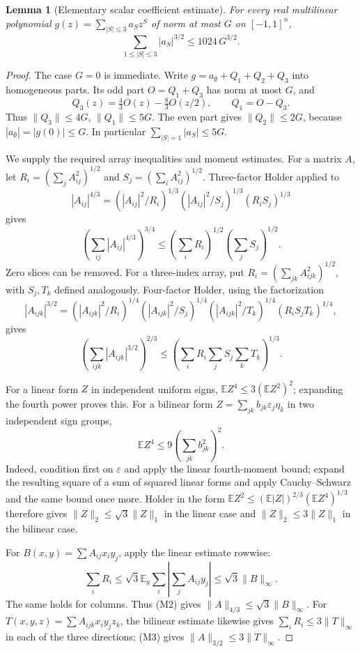 \documentclass[11pt]{article}
\newtheorem{lemma}[theorem]{Lemma}
\newcommand{\E}{\mathbb E}
\begin{document}
\begin{lemma}[Elementary scalar coefficient estimate]\label{lem:bh}
For every real multilinear polynomial $g(z)=\sum_{|S|\le3}a_Sz^S$
of norm at most $G$ on $[-1,1]^n$,
\[
 \sum_{1\le|S|\le3}|a_S|^{3/2}\le1024\,G^{3/2}.
 \label{eq:bh}\tag{CB}
\]
\end{lemma}
\begin{proof}
The case $G=0$ is immediate. Write $g=a_\emptyset+Q_1+Q_2+Q_3$
into homogeneous parts. Its odd part $O=Q_1+Q_3$ has norm at most
$G$, and
\[
 Q_3(z)=\tfrac43 O(z)-\tfrac83 O(z/2),\qquad Q_1=O-Q_3.
\]
Thus $\|Q_3\|\le4G$, $\|Q_1\|\le5G$. The even part gives
$\|Q_2\|\le2G$, because $|a_\emptyset|=|g(0)|\le G$.
In particular $\sum_{|S|=1}|a_S|\le5G$.

We supply the required array inequalities and moment estimates.
For a matrix $A$, let $R_i=(\sum_j A_{ij}^2)^{1/2}$ and
$S_j=(\sum_i A_{ij}^2)^{1/2}$. Three-factor Holder applied to
\[
 |A_{ij}|^{4/3}=
 (|A_{ij}|^2/R_i)^{1/3}(|A_{ij}|^2/S_j)^{1/3}(R_iS_j)^{1/3}
\]
gives
\[
 \left(\sum_{ij}|A_{ij}|^{4/3}\right)^{3/4}
 \le\left(\sum_iR_i\right)^{1/2}
      \left(\sum_jS_j\right)^{1/2}.\tag{M2}
\]
Zero slices can be removed. For a three-index array, put
$R_i=(\sum_{jk}A_{ijk}^2)^{1/2}$, with $S_j,T_k$ defined analogously.
Four-factor Holder, using the factorization
\[
 |A_{ijk}|^{3/2}=
 (|A_{ijk}|^2/R_i)^{1/4}
 (|A_{ijk}|^2/S_j)^{1/4}
 (|A_{ijk}|^2/T_k)^{1/4}(R_iS_jT_k)^{1/4},
\]
gives
\[
 \left(\sum_{ijk}|A_{ijk}|^{3/2}\right)^{2/3}
 \le\left(\sum_iR_i\sum_jS_j\sum_kT_k\right)^{1/3}.\tag{M3}
\]

For a linear form $Z$ in independent uniform signs,
$\E Z^4\le3(\E Z^2)^2$; expanding the fourth power proves this.
For a bilinear form $Z=\sum_{jk}b_{jk}\varepsilon_j\eta_k$ in two
independent sign groups,
\[
 \E Z^4\le9\left(\sum_{jk}b_{jk}^2\right)^2.
\]
Indeed, condition first on $\varepsilon$ and apply the linear
fourth-moment bound; expand the resulting square of a sum of squared
linear forms and apply Cauchy--Schwarz and the same bound once more.
Holder in the form
$\E Z^2\le(\E|Z|)^{2/3}(\E Z^4)^{1/3}$ therefore gives
$\|Z\|_2\le\sqrt3\|Z\|_1$ in the linear case and
$\|Z\|_2\le3\|Z\|_1$ in the bilinear case.

For $B(x,y)=\sum A_{ij}x_iy_j$, apply the linear estimate rowwise:
\[
 \sum_iR_i\le\sqrt3\E_y\sum_i|\sum_jA_{ij}y_j|
 \le\sqrt3\|B\|_\infty.
\]
The same holds for columns. Thus (M2) gives
$\|A\|_{4/3}\le\sqrt3\|B\|_\infty$.
For $T(x,y,z)=\sum A_{ijk}x_iy_jz_k$, the bilinear estimate likewise
gives $\sum_iR_i\le3\|T\|_\infty$ in each of the three directions;
(M3) gives $\|A\|_{3/2}\le3\|T\|_\infty$.


\end{proof}
\end{document}
